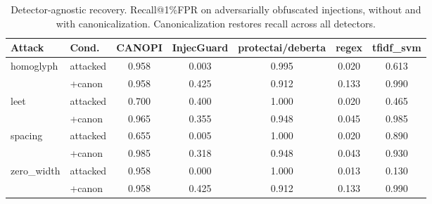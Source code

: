 \begin{table}[ht]\centering
\caption{Detector-agnostic recovery. Recall@1\%FPR on adversarially obfuscated injections, without and with canonicalization. Canonicalization restores recall across all detectors.}
\label{tab:recovery}
\small
\begin{tabular}{llccccc}
\toprule
Attack & Cond. & CANOPI & InjecGuard & protectai/deberta & regex & tfidf_svm \\
\midrule
homoglyph & attacked & 0.958 & 0.003 & 0.995 & 0.020 & 0.613 \\
 & +canon & 0.958 & 0.425 & 0.912 & 0.133 & 0.990 \\
\midrule
leet & attacked & 0.700 & 0.400 & 1.000 & 0.020 & 0.465 \\
 & +canon & 0.965 & 0.355 & 0.948 & 0.045 & 0.985 \\
\midrule
spacing & attacked & 0.655 & 0.005 & 1.000 & 0.020 & 0.890 \\
 & +canon & 0.985 & 0.318 & 0.948 & 0.043 & 0.930 \\
\midrule
zero_width & attacked & 0.958 & 0.000 & 1.000 & 0.013 & 0.130 \\
 & +canon & 0.958 & 0.425 & 0.912 & 0.133 & 0.990 \\
\midrule
\bottomrule
\end{tabular}
\end{table}